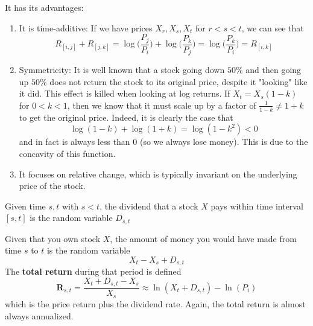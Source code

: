 \documentclass{article}
\begin{document}
    It has its advantages: 
    \begin{enumerate}
      \item It is time-additive: If we have prices $X_r, X_s, X_t$ for $r < s < t$, we can see that 
      \begin{equation}
        R_{[i, j]} + R_{[j, k]} = \log \bigg(\frac{P_j}{P_i}\bigg) + \log \bigg( \frac{P_k}{P_j} \bigg) = \log \bigg(\frac{P_k}{P_i} \bigg) = R_{[i, k]}
      \end{equation}

      \item Symmetricity: It is well known that a stock going down $50\%$ and then going up $50\%$ does not return the stock to its original price, despite it "looking" like it did. This effect is killed when looking at log returns. If $X_t = X_s (1 - k)$ for $0 < k < 1$, then we know that it must scale up by a factor of $\frac{1}{1 - k} \neq 1 + k$ to get the original price. Indeed, it is clearly the case that 
      \begin{equation}
        \log(1 - k) + \log(1 + k) = \log(1 - k^2) < 0
      \end{equation}
      and in fact is always less than $0$ (so we always lose money). This is due to the concavity of this function. 
      
      \item It focuses on relative change, which is typically invariant on the underlying price of the stock. 
    \end{enumerate}

    \begin{definition}[Dividend]
      \label{def:dividend}
      Given time $s, t$ with $s < t$, the dividend that a stock $X$ pays within time interval $[s, t]$ is the random variable $D_{s, t}$
    \end{definition}

    \begin{definition}
      \label{def:total-return}
      Given that you own stock $X$, the amount of money you would have made from time $s$ to $t$ is the random variable 
      \begin{equation}
        X_t - X_s + D_{s, t}
      \end{equation}
      The \textbf{total return} during that period is defined 
      \begin{equation}
        \mathbf{R}_{s, t} = \frac{X_t + D_{s, t} - X_s}{X_s} \approx \ln(X_t + D_{s, t}) - \ln (P_i)
      \end{equation}
      which is the price return plus the dividend rate. Again, the total return is almost always annualized.   
    \end{definition}
\end{document}
